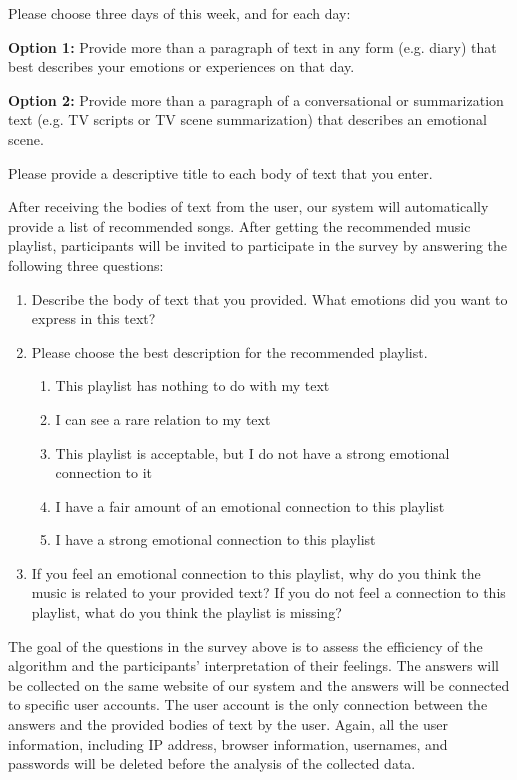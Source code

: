 \begin{displayquote}
  Please choose three days of this week, and for each day:

  \textbf{Option 1:} Provide more than a paragraph of text in any form (e.g. diary)
  that best describes your emotions or experiences on that day.

  \textbf{Option 2:} Provide more than a paragraph of a conversational or summarization
  text (e.g. TV scripts or TV scene summarization) that describes an emotional scene.

  Please provide a descriptive title to each body of text that you enter.
\end{displayquote}

After receiving the bodies of text from the user, our system will automatically
provide a list of recommended songs. After getting the recommended music playlist,
participants will be invited to participate in the survey by answering the following
three questions:

\begin{displayquote}
  \begin{enumerate}
    \item Describe the body of text that you provided. What emotions did you want
    to express in this text?
    \item Please choose the best description for the recommended playlist.
    \begin{enumerate}
      \item This playlist has nothing to do with my text
      \item I can see a rare relation to my text
      \item This playlist is acceptable, but I do not have a strong emotional
      connection to it
      \item I have a fair amount of an emotional connection to this playlist
      \item I have a strong emotional connection to this playlist
    \end{enumerate}
    \item If you feel an emotional connection to this playlist, why do you think
    the music is related to your provided text? If you do not feel a connection
    to this playlist, what do you think the playlist is missing?
  \end{enumerate}
\end{displayquote}

The goal of the questions in the survey above is to assess the efficiency of the
algorithm and the participants’ interpretation of their feelings. The answers will
be collected on the same website of our system and the answers will be connected
to specific user accounts. The user account is the only connection between the
answers and the provided bodies of text by the user. Again, all the user information,
including IP address, browser information, usernames, and passwords will be deleted
before the analysis of the collected data.

